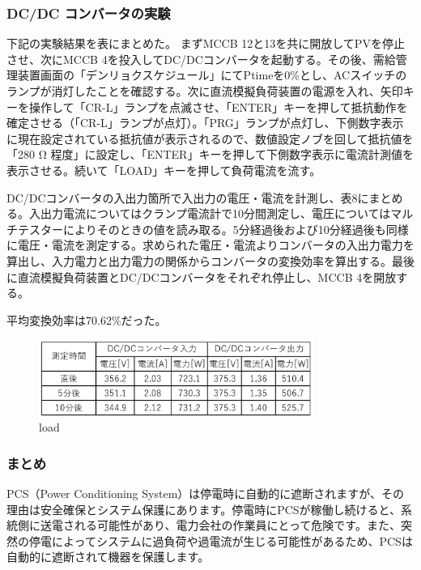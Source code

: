 \documentclass[a4paper,11pt,xelatex,ja=standard]{bxjsarticle}
\begin{document}
                \subsubsection{DC/DC コンバータの実験}
                    下記の実験結果を表にまとめた。
                    まずMCCB 12と13を共に開放してPVを停止させ、次にMCCB 4を投入してDC/DCコンバータを起動する。その後、需給管理装置画面の「デンリョクスケジュール」にてPtimeを0\%とし、ACスイッチのランプが消灯したことを確認する。次に直流模擬負荷装置の電源を入れ、矢印キーを操作して「CR-L」ランプを点滅させ、「ENTER」キーを押して抵抗動作を確定させる（「CR-L」ランプが点灯）。「PRG」ランプが点灯し、下側数字表示に現在設定されている抵抗値が表示されるので、数値設定ノブを回して抵抗値を「280 Ω 程度」に設定し、「ENTER」キーを押して下側数字表示に電流計測値を表示させる。続いて「LOAD」キーを押して負荷電流を流す。

                    DC/DCコンバータの入出力箇所で入出力の電圧・電流を計測し、表8にまとめる。入出力電流についてはクランプ電流計で10分間測定し、電圧についてはマルチテスターによりそのときの値を読み取る。5分経過後および10分経過後も同様に電圧・電流を測定する。求められた電圧・電流よりコンバータの入出力電力を算出し、入力電力と出力電力の関係からコンバータの変換効率を算出する。最後に直流模擬負荷装置とDC/DCコンバータをそれぞれ停止し、MCCB 4を開放する。

                    平均変換効率は70.62\%だった。

                    \begin{figure}[H]
                        \centering
                        \includegraphics[width=0.8\textwidth]{./img/24-1/5.png}
                        \caption{load}
                    \end{figure}


            \subsubsection{まとめ}
                PCS（Power Conditioning System）は停電時に自動的に遮断されますが、その理由は安全確保とシステム保護にあります。停電時にPCSが稼働し続けると、系統側に送電される可能性があり、電力会社の作業員にとって危険です。また、突然の停電によってシステムに過負荷や過電流が生じる可能性があるため、PCSは自動的に遮断されて機器を保護します。
\end{document}

